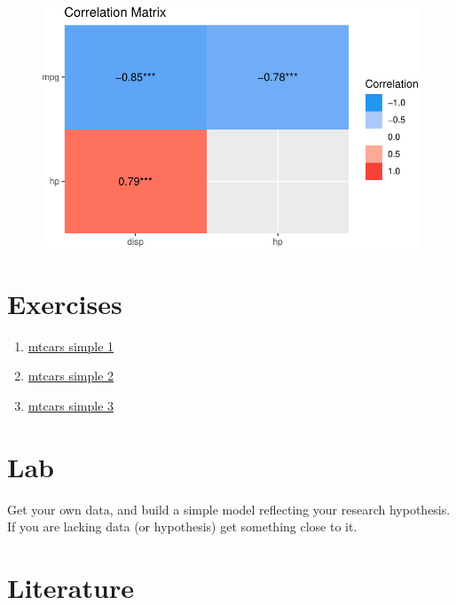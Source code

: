\documentclass[
  letterpaper,
  DIV=11,
  numbers=noendperiod]{scrreprt}
\providecommand{\tightlist}{%
  \setlength{\itemsep}{0pt}\setlength{\parskip}{0pt}}\usepackage{longtable,booktabs,array}
\theoremstyle{definition}
\theoremstyle{definition}
\theoremstyle{remark}
\begin{document}
\begin{figure}[H]

{\centering \includegraphics{./regression1_files/figure-pdf/unnamed-chunk-14-1.pdf}

}

\end{figure}

\hypertarget{exercises}{%
\section{Exercises}\label{exercises}}

\begin{enumerate}
\def\labelenumi{\arabic{enumi}.}
\tightlist
\item
  \href{https://datenwerk.netlify.app/posts/mtcars-simple1/mtcars-simple1/}{mtcars
  simple 1}
\item
  \href{https://datenwerk.netlify.app/posts/mtcars-simple2/mtcars-simple2/}{mtcars
  simple 2}
\item
  \href{https://datenwerk.netlify.app/posts/mtcars-simple3/mtcars-simple3/}{mtcars
  simple 3}
\end{enumerate}

\hypertarget{lab}{%
\section{Lab}\label{lab}}

Get your own data, and build a simple model reflecting your research
hypothesis. If you are lacking data (or hypothesis) get something close
to it.

\hypertarget{literature-2}{%
\section{Literature}\label{literature-2}}
\end{document}
